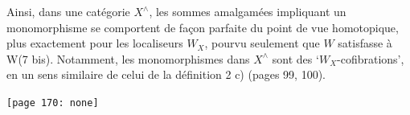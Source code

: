 \documentclass[11pt]{article}
\newcommand{\msp}[1]{\marginpar{\footnotesize [#1]}}
\begin{document}
Ainsi, dans une catégorie $X^\wedge$, les sommes amalgamées impliquant un monomorphisme se comportent de façon parfaite du point de vue homotopique, plus exactement pour les localiseurs $W_X$, pourvu \msp{page 169} seulement que $W$ satisfasse à W(7 bis). Notamment, les monomorphismes dans $X^\wedge$ sont des ‘$W_X$-cofibrations’, en un sens similaire de celui de la définition 2 c) (pages 99, 100).

\texttt{[page 170: none]}
\end{document}
